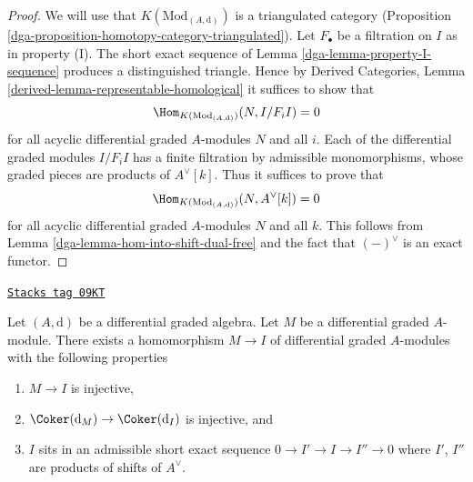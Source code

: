 \begin{proof}

We will use that $K(\text{Mod}_{(A, \text{d})})$ is a triangulated
category (Proposition \ref{dga-proposition-homotopy-category-triangulated}).
Let $F_\bullet$ be a filtration on $I$ as in property (I).
The short exact sequence of Lemma \ref{dga-lemma-property-I-sequence}
produces a distinguished triangle. Hence by
Derived Categories, Lemma \ref{derived-lemma-representable-homological}
it suffices to show that
$$
\Hom_{K(\text{Mod}_{(A, \text{d})})}(N, I/F_iI) = 0
$$
for all acyclic differential graded $A$-modules $N$ and all $i$.
Each of the differential graded modules $I/F_iI$ has a finite filtration
by admissible monomorphisms, whose graded pieces are
products of $A^\vee[k]$. Thus it suffices to prove that
$$
\Hom_{K(\text{Mod}_{(A, \text{d})})}(N, A^\vee[k]) = 0
$$
for all acyclic differential graded $A$-modules $N$ and all $k$.
This follows from Lemma \ref{dga-lemma-hom-into-shift-dual-free}
and the fact that $(-)^\vee$ is an exact functor.
\end{proof}

\begin{lemma}
\label{dga-lemma-good-sub}
\href{https://stacks.math.columbia.edu/tag/09KT}{\texttt{Stacks tag 09KT}}

Let $(A, \text{d})$ be a differential graded algebra.
Let $M$ be a differential graded $A$-module. There exists a homomorphism
$M \to I$ of differential graded $A$-modules with the following
properties
\begin{enumerate}
\item $M \to I$ is injective,
\item $\Coker(\text{d}_M) \to \Coker(\text{d}_I)$ is injective,
and
\item $I$ sits in an admissible short exact sequence
$0 \to I' \to I \to I'' \to 0$ where $I'$, $I''$ are products
of shifts of $A^\vee$.
\end{enumerate}
\end{lemma}


